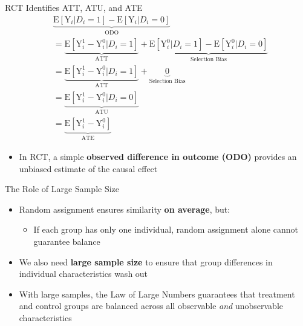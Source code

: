 \documentclass[hyperref={pdfpagelabels=false}]{beamer}
\begin{document}
	\begin{frame}{RCT Identifies ATT, ATU, and ATE}
		\begin{equation*}
			\begin{aligned}
				& \underbrace{\mathrm{E}[\mathrm{Y}_{i}|D_i=1] - \mathrm{E}[\mathrm{Y}_{i}|D_i=0]}_{\text{ODO}} \\
				&= \underbrace{\mathrm{E}[\mathrm{Y}^{1}_{i}-\mathrm{Y}^{0}_{i}|D_i=1]}_{\text{ATT}} + \underbrace{\mathrm{E}[\mathrm{Y}^{0}_{i}|D_i=1]-\mathrm{E}[\mathrm{Y}^{0}_{i}|D_i=0]}_{\text{Selection Bias}} \\
				&= \underbrace{\mathrm{E}[\mathrm{Y}^{1}_{i}-\mathrm{Y}^{0}_{i}|D_i=1]}_{\text{ATT}} + \underbrace{0}_{\text{Selection Bias}} \\
				&= \underbrace{\mathrm{E}[\mathrm{Y}^{1}_{i}-\mathrm{Y}^{0}_{i}|D_i=0]}_{\text{ATU}} \\
				&= \underbrace{\mathrm{E}[\mathrm{Y}^{1}_{i}-\mathrm{Y}^{0}_{i}]}_{\text{ATE}}
			\end{aligned}
		\end{equation*}
		\vspace{0.1cm}
		\begin{itemize}
			\item In RCT, a simple \textbf{observed difference in outcome (ODO)} provides an unbiased estimate of the causal effect
		\end{itemize}
	\end{frame}
	
	\begin{frame}{The Role of Large Sample Size}
		\begin{itemize}
			\item Random assignment ensures similarity \textbf{on average}, but:
			\vspace{0.2cm}
			\begin{itemize}
				\item If each group has only one individual, random assignment alone cannot guarantee balance
			\end{itemize}
			\vspace{0.3cm}
			\item We also need \textbf{large sample size} to ensure that group differences in individual characteristics wash out
			\vspace{0.3cm}
			\item With large samples, the Law of Large Numbers guarantees that treatment and control groups are balanced across all observable \emph{and} unobservable characteristics
		\end{itemize}
	\end{frame}
	
\end{document}
